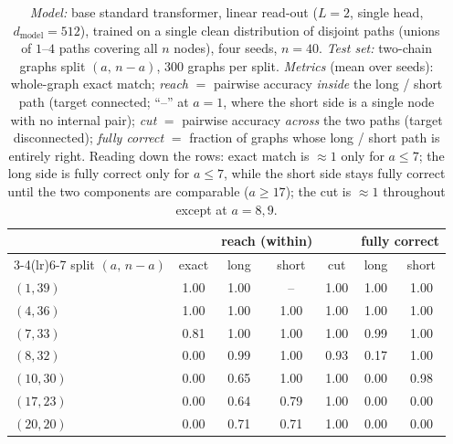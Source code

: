\documentclass[11pt,a4paper]{article}
\begin{document}
\begin{table}[H]\centering\small
\begin{tabular}{lcccccc}
\toprule
 & & \multicolumn{2}{c}{reach (within)} & & \multicolumn{2}{c}{fully correct}\\
\cmidrule(lr){3-4}\cmidrule(lr){6-7}
split $(a,\,n{-}a)$ & exact & long & short & cut & long & short\\
\midrule
$(1,39)$  & 1.00 & 1.00 & --   & 1.00 & 1.00 & 1.00\\
$(4,36)$  & 1.00 & 1.00 & 1.00 & 1.00 & 1.00 & 1.00\\
$(7,33)$  & 0.81 & 1.00 & 1.00 & 1.00 & 0.99 & 1.00\\
$(8,32)$  & 0.00 & 0.99 & 1.00 & 0.93 & 0.17 & 1.00\\
$(10,30)$ & 0.00 & 0.65 & 1.00 & 1.00 & 0.00 & 0.98\\
$(17,23)$ & 0.00 & 0.64 & 0.79 & 1.00 & 0.00 & 0.00\\
$(20,20)$ & 0.00 & 0.71 & 0.71 & 1.00 & 0.00 & 0.00\\
\bottomrule\end{tabular}
\caption{\emph{Model:} base standard transformer, linear read-out ($L=2$, single head,
$d_{\mathrm{model}}=512$), trained on a single clean distribution of disjoint paths (unions of $1$–$4$
paths covering all $n$ nodes), four seeds, $n=40$. \emph{Test set:} two-chain graphs split
$(a,\,n{-}a)$, $300$ graphs per split. \emph{Metrics} (mean over seeds): whole-graph exact match;
\emph{reach} $=$ pairwise accuracy \emph{inside} the long / short path (target connected; ``--'' at
$a=1$, where the short side is a single node with no internal pair); \emph{cut} $=$ pairwise accuracy
\emph{across} the two paths (target disconnected); \emph{fully correct} $=$ fraction of graphs whose
long / short path is entirely right. Reading down the rows: exact match is $\approx1$ only for
$a\le7$; the long side is fully correct only for $a\le7$, while the short side stays fully correct
until the two components are comparable ($a\ge17$); the cut is $\approx1$ throughout except at
$a=8,9$.}
\label{tab:basplit}
\end{table}
\end{document}
